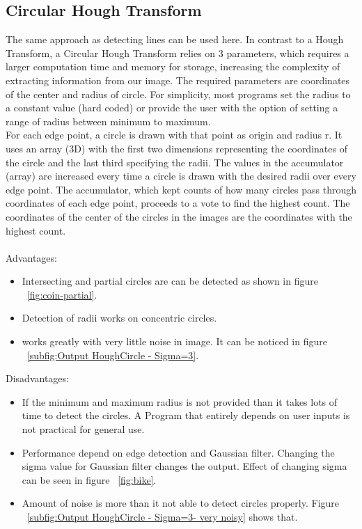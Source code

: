 \documentclass[11pt]{article}
\begin{document}
\subsection{Circular Hough Transform}
The same approach as detecting lines can be used here. In contrast to a Hough Transform, a Circular Hough Transform relies on 3 parameters, which requires a larger computation time and memory for storage, increasing the complexity of extracting information from our image. The required parameters are coordinates of the center and radius of circle. For simplicity, most programs set the radius to a constant value (hard coded) or provide the user with the option of setting a range of radius between minimum to maximum.
\\
For each edge point, a circle is drawn with that point as origin and radius r. It uses an array (3D) with the first two dimensions representing the coordinates of the circle and the last third specifying the radii. The values in the accumulator (array) are increased every time a circle is drawn with the desired radii over every edge point. The accumulator, which kept counts of how many circles pass through coordinates of each edge point, proceeds to a vote to find the highest count. The coordinates of the center of the circles in the images are the coordinates with the highest count.
\\
\\Advantages:
\begin{itemize}[itemsep=0em]
\item Intersecting and partial circles are can be detected as shown in figure ~\ref{fig:coin-partial}.
\item
Detection of radii works on concentric circles.
\item
works greatly with very little noise in image. It can be noticed in figure ~\ref{subfig:Output HoughCircle - Sigma=3}.
\end{itemize}
Disadvantages:
\begin{itemize}[itemsep=0em]
\item
If the minimum and maximum radius is not provided than it takes lots of time to detect the circles. A Program that entirely depends on user inputs is not practical for general use.
\item
Performance depend on edge detection and Gaussian filter. Changing the sigma value for Gaussian filter changes the output. Effect of changing sigma can be seen in figure ~\ref{fig:bike}.
\item
Amount of noise is more than it not able to detect circles properly. Figure ~\ref{subfig:Output HoughCircle - Sigma=3- very noisy} shows that.
\end{itemize}
\end{document}
